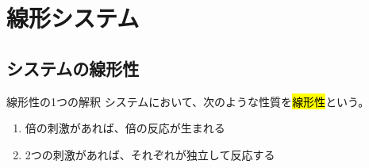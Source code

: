 \documentclass[../imaging-math]{subfiles}
\begin{document}
\chapter{線形システム}

\section{システムの線形性}

\begin{definition}{線形性の1つの解釈}
  システムにおいて、次のような性質を\hl{線形性}という。
  \begin{enumerate}
    \item 倍の刺激があれば、倍の反応が生まれる
    \item 2つの刺激があれば、それぞれが独立して反応する
  \end{enumerate}
\end{definition}
\end{document}
